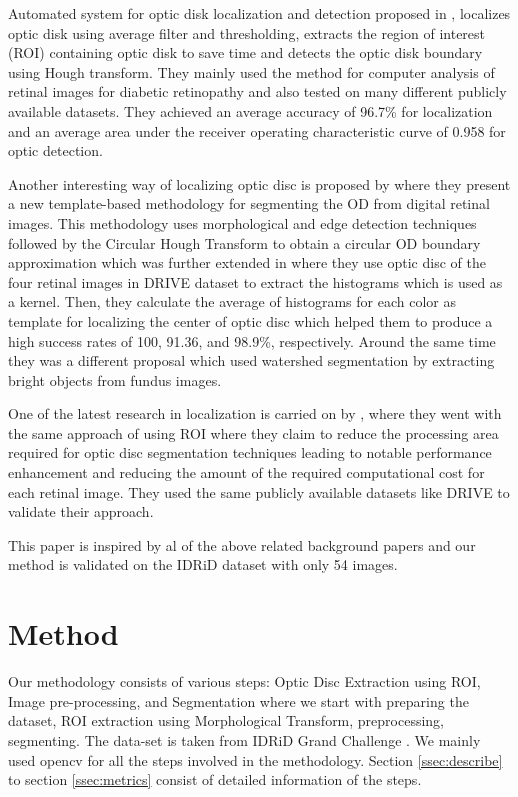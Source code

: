\documentclass[conference]{IEEEtran}
\begin{document}
Automated system for optic disk localization and detection proposed in \cite{p5}, localizes optic disk using average filter and thresholding, extracts the region of interest (ROI) containing optic disk to save time and detects the optic disk boundary using Hough transform. They mainly used the method for computer analysis of retinal images for diabetic retinopathy and also tested on many different publicly available datasets. They achieved an average accuracy of 96.7\% for localization and an average area under the receiver operating characteristic curve of 0.958 for optic detection.
\par
Another interesting way of localizing optic disc is proposed by \cite{p3} where they present a new template-based methodology for segmenting the OD from digital retinal images. This methodology uses morphological and edge detection techniques followed by the Circular Hough Transform to obtain a
circular OD boundary approximation which was further extended in \cite{p1} where they use optic disc of the four retinal images in DRIVE dataset\cite{drive} to extract the histograms which is used as a kernel. Then, they calculate the average of histograms for each color as template for localizing the center of optic disc which helped them to produce a high success rates of 100, 91.36, and 98.9\%, respectively. Around the same time they was a different proposal \cite{p4} which used watershed segmentation by extracting bright objects from fundus images.
\par
One of the latest research in localization is carried on by  \cite{p2}, where they went with the same approach of using ROI where they claim to reduce the processing area required for optic disc segmentation techniques leading to notable performance enhancement and reducing the amount of the required computational cost for each retinal image. They used the same publicly available datasets like DRIVE\cite{drive} to validate their approach.
\par
This paper is inspired by al of the above related background papers and our method is validated on the IDRiD dataset\cite{idrid} with only 54 images.

\section{Method}                                                                     
Our methodology consists of various steps: Optic Disc Extraction using ROI, Image pre-processing, and Segmentation where we start with preparing the dataset, ROI extraction using Morphological Transform, preprocessing, segmenting. The data-set is taken from IDRiD Grand Challenge \cite{idrid}. We mainly  used opencv for all the steps involved in the methodology. Section \ref{ssec:describe} to section \ref{ssec:metrics} consist of detailed information of the steps.  
\end{document}

